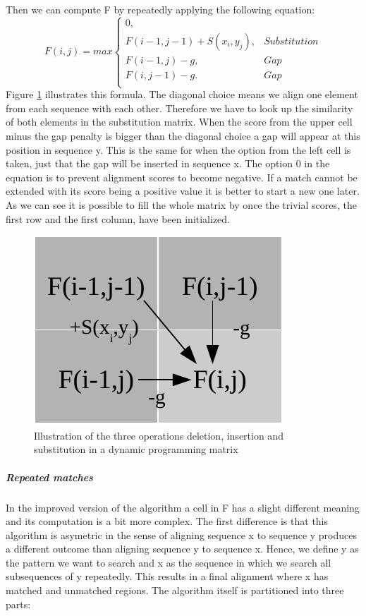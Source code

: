 Then we can compute F by repeatedly applying the following equation:
\begin{equation}
F(i,j) = max \left\{ \begin{array}{lr}0,&\\F(i-1,j-1)+S(x_i,y_j),&Substitution\\F(i-1,j)-g,&Gap\\F(i,j-1)-g.&Gap\\\end{array} \right. 
\end{equation}
Figure \ref{fig:basicalignmentoperations} illustrates this formula. The diagonal choice means we align one element from each sequence with each other. Therefore we have to look up the similarity of both elements in the substitution matrix. 
When the score from the upper cell minus the gap penalty is bigger than the diagonal choice a gap will appear at this position in sequence y. 
This is the same for when the option from the left cell is taken, just that the gap will be inserted in sequence x. 
The option 0 in the equation is to prevent alignment scores to become negative. 
If a match cannot be extended with its score being a positive value it is better to start a new one later. 
As we can see it is possible to fill the whole matrix by once the trivial scores, the first row and the first column, have been initialized.

\begin{figure}
	\centering
	\includegraphics{img/basic_cell_fill.pdf}
	\caption{Illustration of the three operations deletion, insertion and substitution in a dynamic programming matrix}
	\label{fig:basicalignmentoperations}
\end{figure}

\subparagraph{Repeated matches}
In the improved version of the algorithm a cell in F has a slight different meaning and its computation is a bit more complex. 
The first difference is that this algorithm is asymetric in the sense of aligning sequence x to sequence y produces a different outcome than aligning sequence y to sequence x. Hence, we define y as the pattern we want to search and x as the sequence in which we search all subsequences of y repeatedly. This results in a final alignment where x has matched and unmatched regions.  
The algorithm itself is partitioned into three parts: 

